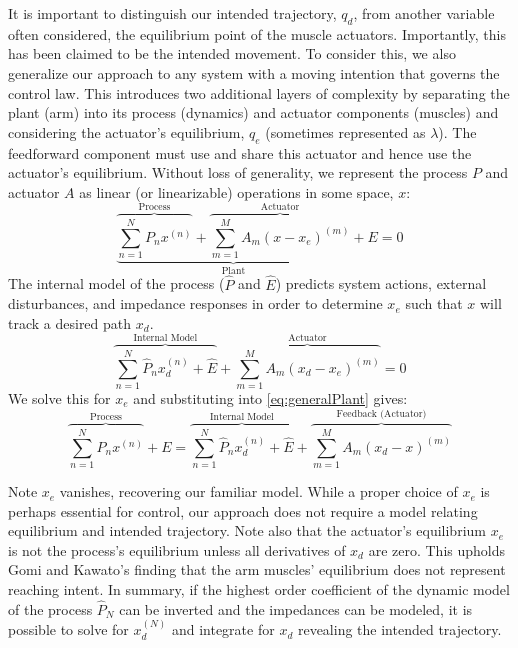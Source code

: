 It is important to distinguish our intended trajectory, $q_d$, from another variable often considered, the equilibrium point of the muscle actuators. Importantly, this has been claimed to be the intended movement. To consider this, we also generalize our approach to any system with a moving intention that governs the control law. This introduces two additional layers of complexity by separating the plant (arm) into its process (dynamics) and actuator components (muscles) and considering the actuator's equilibrium, $q_e$ (sometimes represented as $\lambda$). The feedforward component must use and share this actuator and hence use the actuator's equilibrium. Without loss of generality, we represent the process $P$ and actuator $A$ as linear (or linearizable) operations in some space, $x$:
\begin{equation} \label{eq:generalPlant}
\underbrace{\overbrace{\sum_{n=1}^N P_nx^{(n)}}^\text{Process}+\overbrace{\sum_{m=1}^M A_m(x-x_e)^{(m)}}^\text{Actuator}}_\text{Plant}+E=0
\end{equation}
The internal model of the process ($\hat{P}$ and $\hat{E}$) predicts system actions, external disturbances, and impedance responses in order to determine $x_e$ such that $x$ will track a desired path $x_d$.    
\begin{equation}
\overbrace{\sum_{n=1}^N \hat{P}_n x^{(n)}_d+\hat{E}}^\text{Internal Model}+\overbrace{\sum_{m=1}^M A_m(x_d-x_e)^{(m)}}^\text{Actuator}=0
\end{equation}
We solve this for $x_e$ and substituting into \eqref{eq:generalPlant} gives:
\begin{equation}
\overbrace{\sum_{n=1}^N P_nx^{(n)}}^\text{Process}+E=\overbrace{\sum_{n=1}^N \hat{P}_n x^{(n)}_d+\hat{E}}^\text{Internal Model}+\overbrace{\sum_{m=1}^M A_m (x_d-x)^{(m)}}^\text{Feedback (Actuator)}
\end{equation}

Note $x_e$ vanishes, recovering our familiar model. While a proper choice of $x_e$ is perhaps essential for control, our approach does not require a model relating equilibrium and intended trajectory. Note also that the actuator's equilibrium $x_e$ is not the process's equilibrium unless all derivatives of $x_d$ are zero. This upholds Gomi and Kawato's finding that the arm muscles' equilibrium does not represent reaching intent\cite{gomi1997human}. In summary, if the highest order coefficient of the dynamic model of the process $\hat{P}_N$ can be inverted and the impedances can be modeled, it is possible to solve for $x_d^{(N)}$ and integrate for $x_d$ revealing the intended trajectory.

